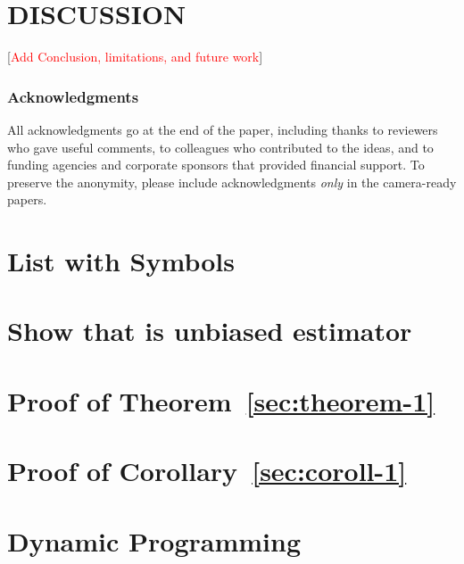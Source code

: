\documentclass[twoside]{article}
\newcommand{\todo}[1]{[\textcolor{red}{#1}]}
\begin{document}
\section{DISCUSSION}

\todo{Add Conclusion, limitations, and future work}

\subsubsection*{Acknowledgments}
All acknowledgments go at the end of the paper, including thanks to reviewers who gave useful comments, to colleagues who contributed to the ideas, and to funding agencies and corporate sponsors that provided financial support. 
To preserve the anonymity, please include acknowledgments \emph{only} in the camera-ready papers.



\appendix

\section{List with Symbols}
\label{sec:list-with-symbols}

\section{Show that is unbiased estimator}
\label{sec:proof-1}

\section{Proof of Theorem~\ref{sec:theorem-1}}
\label{sec:proof-of-3-1}

\section{Proof of Corollary~\ref{sec:coroll-1}}
\label{sec:proof-of-coroll}

\section{Dynamic Programming}
\label{sec:dynamic-programming}
\end{document}
